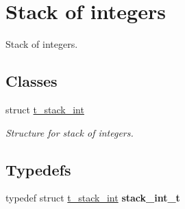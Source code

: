 \hypertarget{group__integer__stack}{}\section{Stack of integers}
\label{group__integer__stack}


Stack of integers.  


\subsection*{Classes}
\begin{DoxyCompactItemize}
\item 
struct \hyperlink{structt__stack__int}{t\+\_\+stack\+\_\+int}
\begin{DoxyCompactList}\small\item\em Structure for stack of integers. \end{DoxyCompactList}\end{DoxyCompactItemize}
\subsection*{Typedefs}
\begin{DoxyCompactItemize}
\item 
\hypertarget{group__integer__stack_ga84e3a9a650bddbb74d7eb9d4eb61ebb7}{}typedef struct \hyperlink{structt__stack__int}{t\+\_\+stack\+\_\+int} {\bfseries stack\+\_\+int\+\_\+t}\label{group__integer__stack_ga84e3a9a650bddbb74d7eb9d4eb61ebb7}

\end{DoxyCompactItemize}
